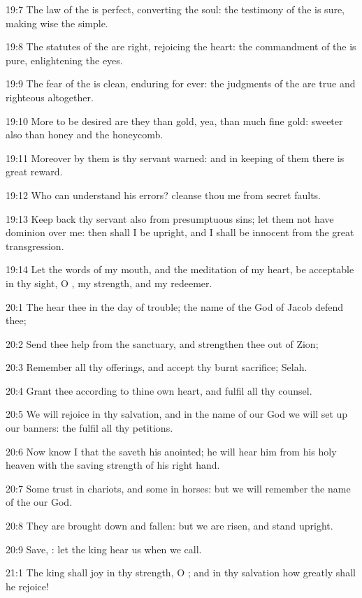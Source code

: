 19:7 The law of the \LORD is perfect, converting the soul: the
testimony of the \LORD is sure, making wise the simple.

19:8 The statutes of the \LORD are right, rejoicing the heart: the
commandment of the \LORD is pure, enlightening the eyes.

19:9 The fear of the \LORD is clean, enduring for ever: the judgments
of the \LORD are true and righteous altogether.

19:10 More to be desired are they than gold, yea, than much fine gold:
sweeter also than honey and the honeycomb.

19:11 Moreover by them is thy servant warned: and in keeping of them
there is great reward.

19:12 Who can understand his errors? cleanse thou me from secret
faults.

19:13 Keep back thy servant also from presumptuous sins; let them not
have dominion over me: then shall I be upright, and I shall be
innocent from the great transgression.

19:14 Let the words of my mouth, and the meditation of my heart, be
acceptable in thy sight, O \LORD, my strength, and my redeemer.



20:1 The \LORD hear thee in the day of trouble; the name of the God of
Jacob defend thee;

20:2 Send thee help from the sanctuary, and strengthen thee out of
Zion;

20:3 Remember all thy offerings, and accept thy burnt sacrifice;
Selah.

20:4 Grant thee according to thine own heart, and fulfil all thy
counsel.

20:5 We will rejoice in thy salvation, and in the name of our God we
will set up our banners: the \LORD fulfil all thy petitions.

20:6 Now know I that the \LORD saveth his anointed; he will hear him
from his holy heaven with the saving strength of his right hand.

20:7 Some trust in chariots, and some in horses: but we will remember
the name of the \LORD our God.

20:8 They are brought down and fallen: but we are risen, and stand
upright.

20:9 Save, \LORD: let the king hear us when we call.



21:1 The king shall joy in thy strength, O \LORD; and in thy salvation
how greatly shall he rejoice!

